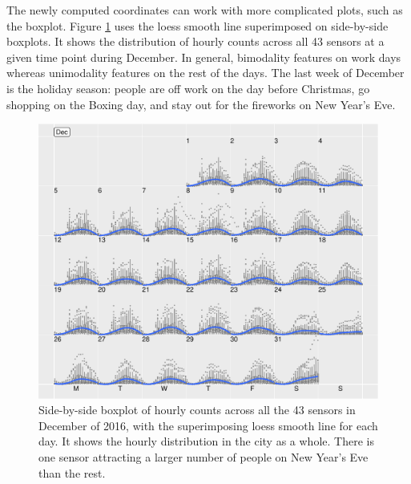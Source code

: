 \documentclass[article]{jss}
\theoremstyle{definition}
\theoremstyle{definition}
\theoremstyle{remark}
\begin{document}
The newly computed coordinates can work with more complicated plots,
such as the boxplot. Figure \ref{fig:boxplot} uses the loess smooth line
superimposed on side-by-side boxplots. It shows the distribution of
hourly counts across all 43 sensors at a given time point during
December. In general, bimodality features on work days whereas
unimodality features on the rest of the days. The last week of December
is the holiday season: people are off work on the day before Christmas,
go shopping on the Boxing day, and stay out for the fireworks on New
Year's Eve.

\begin{CodeChunk}
\begin{figure}

{\centering \includegraphics[width=\textwidth]{figure/boxplot-1} 

}

\caption[Side-by-side boxplot of hourly counts across all the
43 sensors in December of 2016, with the superimposing loess smooth line
for each day. It shows the hourly distribution in the city as a whole.
There is one sensor attracting a larger number of people on New Year's
Eve than the rest.]{Side-by-side boxplot of hourly counts across all the
43 sensors in December of 2016, with the superimposing loess smooth line
for each day. It shows the hourly distribution in the city as a whole.
There is one sensor attracting a larger number of people on New Year's
Eve than the rest.}\label{fig:boxplot}
\end{figure}
\end{CodeChunk}
\end{document}

